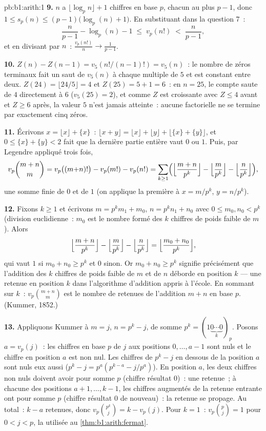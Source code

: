 \begin{solution}{pb:b1:arith:1}
\textbf{9.} $n$ a $\lfloor \log_p n \rfloor + 1$ chiffres en base
$p$, chacun au plus $p - 1$, donc $1 \leq s_p(n) \leq
(p-1)\bigl(\log_p(n) + 1\bigr)$. En substituant dans la question 7~:
\[
\frac n{p-1} - \log_p(n) - 1 \;\leq\; v_p(n!) \;<\; \frac n{p-1},
\]
et en divisant par $n$~: $\frac{v_p(n!)}n \to \frac1{p-1}$.

\textbf{10.} $Z(n) - Z(n-1) = v_5(n!/(n-1)!) = v_5(n)$~: le nombre
de zéros terminaux fait un saut de $v_5(n)$ à chaque multiple de $5$ et est
constant entre deux. $Z(24) = \lfloor24/5\rfloor = 4$ et $Z(25) =
5 + 1 = 6$~: en $n = 25$, le compte saute de $4$ directement à $6$
($v_5(25) = 2$), et comme $Z$ est croissante avec $Z \leq 4$
avant et $Z \geq 6$ après, la valeur $5$ n'est jamais atteinte~: aucune
factorielle ne se termine par exactement cinq zéros.

\textbf{11.} Écrivons $x = \lfloor x\rfloor + \{x\}$~: $\lfloor x +
y\rfloor = \lfloor x\rfloor + \lfloor y\rfloor + \lfloor \{x\} +
\{y\}\rfloor$, et $0 \leq \{x\} + \{y\} < 2$ fait que la dernière partie entière
vaut $0$ ou $1$. Puis, par Legendre appliqué trois fois,
\[
v_p\binom{m+n}m = v_p\bigl((m{+}n)!\bigr) - v_p(m!) - v_p(n!)
= \sum_{k\geq1}\Bigl(
\Bigl\lfloor\frac{m+n}{p^k}\Bigr\rfloor
- \Bigl\lfloor\frac{m}{p^k}\Bigr\rfloor
- \Bigl\lfloor\frac{n}{p^k}\Bigr\rfloor\Bigr),
\]
une somme finie de $0$ et de $1$ (on applique la première  à $x =
m/p^k$, $y = n/p^k$).

\textbf{12.} Fixons $k \geq 1$ et écrivons $m = p^km_1 + m_0$, $n =
p^kn_1 + n_0$ avec $0 \leq m_0, n_0 < p^k$ (division euclidienne~:
$m_0$ est le nombre formé des $k$ chiffres de poids faible de $m$). Alors
\[
\Bigl\lfloor\frac{m+n}{p^k}\Bigr\rfloor
- \Bigl\lfloor\frac m{p^k}\Bigr\rfloor
- \Bigl\lfloor\frac n{p^k}\Bigr\rfloor
= \Bigl\lfloor\frac{m_0 + n_0}{p^k}\Bigr\rfloor ,
\]
qui vaut $1$ si $m_0 + n_0 \geq p^k$ et $0$ sinon. Or $m_0 +
n_0 \geq p^k$ signifie précisément que l'addition des $k$ chiffres de poids faible de $m$
et de $n$ déborde en position $k$ --- une retenue en position $k$
dans l'algorithme d'addition appris à l'école. En sommant sur $k$~:
$v_p\binom{m+n}m$ est le nombre de retenues de l'addition $m + n$ en
base $p$. (Kummer, 1852.)

\textbf{13.} Appliquons Kummer à $m = j$, $n = p^k - j$, de somme $p^k =
(1\underbrace{0\cdots0}_{k})_p$. Posons $a = v_p(j)$~: les chiffres en base $p$
de $j$ aux positions $0, \dots, a-1$ sont nuls et le chiffre
en position $a$ est non nul. Les chiffres de $p^k - j$ en dessous de la position
$a$ sont nuls eux aussi ($p^k - j = p^a(p^{k-a} - j/p^a)$). En position
$a$, les deux chiffres non nuls doivent avoir pour somme $p$ (chiffre résultat $0$)~:
une retenue~; à chacune des positions $a+1, \dots, k-1$, les chiffres augmentés de la
retenue entrante ont pour somme $p$ (chiffre résultat $0$ de nouveau)~: la retenue
se propage. Au total~: $k - a$ retenues, donc $v_p\binom{p^k}j = k -
v_p(j)$. Pour $k = 1$~: $v_p\binom pj = 1$ pour $0 < j < p$, la
 utilisée au \cref{thm:b1:arith:fermat}.


\end{solution}
